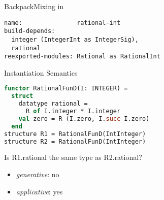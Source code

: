 \documentclass{beamer}
\begin{document}
\begin{frame}[fragile]{Backpack}{Mixing in}
\begin{lstlisting}[language=Cabal,title=Rationals based on Integers]
name:               rational-int
build-depends:
  integer (IntegerInt as IntegerSig),
  rational
reexported-modules: Rational as RationalInt
\end{lstlisting}
\end{frame}

\begin{frame}[fragile]{Instantiation Semantics}
\begin{lstlisting}[language=ML]
functor RationalFunD(I: INTEGER) =
  struct
    datatype rational =
      R of I.integer * I.integer
    val zero = R (I.zero, I.succ I.zero)
  end
structure R1 = RationalFunD(IntInteger)
structure R2 = RationalFunD(IntInteger)
\end{lstlisting}
Is R1.rational the same type as R2.rational?
\begin{itemize}
\item \textit{generative}: no
\item \textit{applicative}: yes
\end{itemize}
\end{frame}
\end{document}

